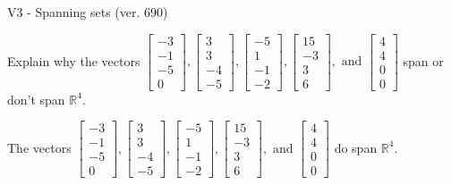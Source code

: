 \begin{exercise}
  \begin{exerciseTitle}V3 - Spanning sets (ver. 690)\end{exerciseTitle}
  \begin{exerciseStatement}
    Explain why the vectors \(\left[\begin{array}{r}
-3 \\
-1 \\
-5 \\
0
\end{array}\right] , \left[\begin{array}{r}
3 \\
3 \\
-4 \\
-5
\end{array}\right] , \left[\begin{array}{r}
-5 \\
1 \\
-1 \\
-2
\end{array}\right] , \left[\begin{array}{r}
15 \\
-3 \\
3 \\
6
\end{array}\right] , \text{ and } \left[\begin{array}{r}
4 \\
4 \\
0 \\
0
\end{array}\right]\) span or don't span \(\mathbb{R}^4\). 
	


  \end{exerciseStatement}
  \begin{exerciseAnswer}
   The vectors \(\left[\begin{array}{r}
-3 \\
-1 \\
-5 \\
0
\end{array}\right] , \left[\begin{array}{r}
3 \\
3 \\
-4 \\
-5
\end{array}\right] , \left[\begin{array}{r}
-5 \\
1 \\
-1 \\
-2
\end{array}\right] , \left[\begin{array}{r}
15 \\
-3 \\
3 \\
6
\end{array}\right] , \text{ and } \left[\begin{array}{r}
4 \\
4 \\
0 \\
0
\end{array}\right]\) 
  	 do  
	span \(\mathbb{R}^4\).
  



\end{exerciseAnswer}
\end{exercise}
